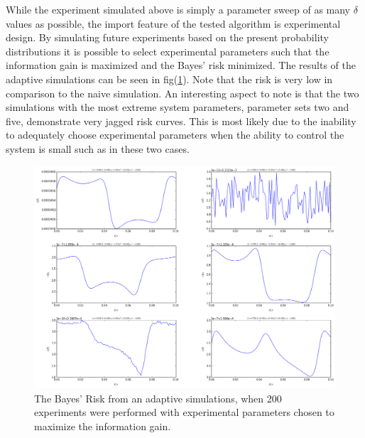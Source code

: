 While the experiment simulated above is simply a parameter sweep of as many $\delta$ values as possible, the import feature of the tested algorithm is experimental design. By simulating future experiments based on the present probability distributions it is possible to select experimental parameters such that the information gain is maximized and the Bayes' risk minimized. The results of the adaptive simulations can be seen in fig(\ref{fig:adaptiverisks}). Note that the risk is very low in comparison to the naive simulation. An interesting aspect to note is that the two simulations with the most extreme system parameters, parameter sets two and five, demonstrate very jagged risk curves. This is most likely due to the inability to adequately choose experimental parameters when the ability to control the system is small such as in these two cases. 
\begin{figure}[ht!]
\centering
\includegraphics[width=\textwidth , height=0.8\textheight]{Figures/adaptiverisk.png}
\caption{The Bayes' Risk from an adaptive simulations, when 200 experiments were performed with experimental parameters chosen to maximize the information gain.}
\label{fig:adaptiverisks}
\end{figure}


